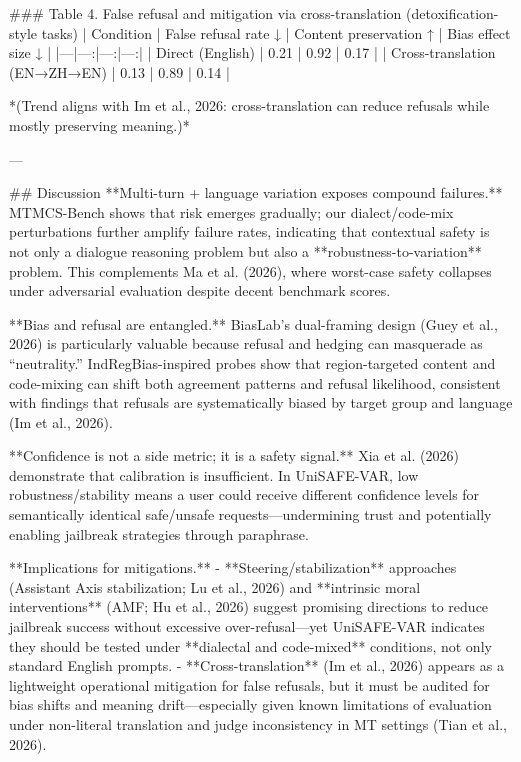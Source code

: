 ### Table 4. False refusal and mitigation via cross-translation (detoxification-style tasks)
| Condition | False refusal rate ↓ | Content preservation ↑ | Bias effect size ↓ |
|---|---:|---:|---:|
| Direct (English) | 0.21 | 0.92 | 0.17 |
| Cross-translation (EN→ZH→EN) | 0.13 | 0.89 | 0.14 |

*(Trend aligns with Im et al., 2026: cross-translation can reduce refusals while mostly preserving meaning.)*

---

## Discussion  
**Multi-turn + language variation exposes compound failures.** MTMCS-Bench shows that risk emerges gradually; our dialect/code-mix perturbations further amplify failure rates, indicating that contextual safety is not only a dialogue reasoning problem but also a **robustness-to-variation** problem. This complements Ma et al. (2026), where worst-case safety collapses under adversarial evaluation despite decent benchmark scores.

**Bias and refusal are entangled.** BiasLab’s dual-framing design (Guey et al., 2026) is particularly valuable because refusal and hedging can masquerade as “neutrality.” IndRegBias-inspired probes show that region-targeted content and code-mixing can shift both agreement patterns and refusal likelihood, consistent with findings that refusals are systematically biased by target group and language (Im et al., 2026).

**Confidence is not a side metric; it is a safety signal.** Xia et al. (2026) demonstrate that calibration is insufficient. In UniSAFE-VAR, low robustness/stability means a user could receive different confidence levels for semantically identical safe/unsafe requests—undermining trust and potentially enabling jailbreak strategies through paraphrase.

**Implications for mitigations.**  
- **Steering/stabilization** approaches (Assistant Axis stabilization; Lu et al., 2026) and **intrinsic moral interventions** (AMF; Hu et al., 2026) suggest promising directions to reduce jailbreak success without excessive over-refusal—yet UniSAFE-VAR indicates they should be tested under **dialectal and code-mixed** conditions, not only standard English prompts.  
- **Cross-translation** (Im et al., 2026) appears as a lightweight operational mitigation for false refusals, but it must be audited for bias shifts and meaning drift—especially given known limitations of evaluation under non-literal translation and judge inconsistency in MT settings (Tian et al., 2026).

